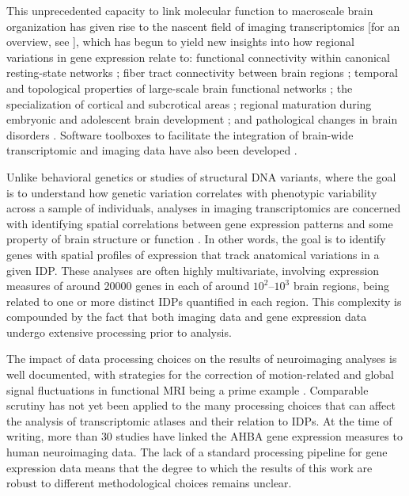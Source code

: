 This unprecedented capacity to link molecular function to macroscale brain organization has given rise to the nascent field of imaging transcriptomics [for an overview, see \citep{Fornito2019}], which has begun to yield new insights into how regional variations in gene expression relate to: functional connectivity within canonical resting-state networks \citep{Richiardi2015,Forest2017};
fiber tract connectivity between brain regions \citep{Goel2014};
temporal and topological properties of large-scale brain functional networks \citep{Cioli2014b,Vertes2016b};
the specialization of cortical and subcrotical areas \citep{Krienen2016,Parkes2017,Anderson2018};
regional maturation during embryonic and adolescent brain development \citep{Kirsch2016a,Whitaker2016a};
and pathological changes in brain disorders \citep{Rittman2016,Romme2017,McColgan2018,Romero-Garcia2018a}. Software toolboxes to facilitate the integration of brain-wide transcriptomic and imaging data have also been developed \citep{French2015,Gorgolewski2015,Rizzo2016,Rittman2017}.

Unlike behavioral genetics or studies of structural DNA variants, where the goal is to understand how genetic variation correlates with phenotypic variability across a sample of individuals, analyses in imaging transcriptomics are concerned with identifying spatial correlations between gene expression patterns and some property of brain structure or function \citep{Fornito2019}. In other words, the goal is to identify genes with spatial profiles of expression that track anatomical variations in a given IDP. These analyses are often highly multivariate, involving expression measures of around \num{20000} genes in each of around $10^{2}–10^{3}$ brain regions, being related to one or more distinct IDPs quantified in each region. This complexity is compounded by the fact that both imaging data and gene expression data undergo extensive processing prior to analysis.

The impact of data processing choices on the results of neuroimaging analyses is well documented, with strategies for the correction of motion-related and global signal fluctuations in functional MRI being a prime example \citep{Power2015a,Power2017,Ciric2017,Parkes2018}. Comparable scrutiny has not yet been applied to the many processing choices that can affect the analysis of transcriptomic atlases and their relation to IDPs. At the time of writing, more than $30$ studies have linked the AHBA gene expression measures to human neuroimaging data. The lack of a standard processing pipeline for gene expression data means that the degree to which the results of this work are robust to different methodological choices remains unclear.

